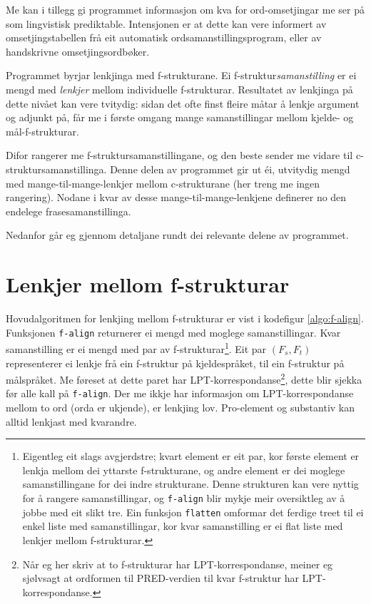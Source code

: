 \documentclass[11pt,a4paper,oneside,draft]{book}
\begin{document}
Me kan i tillegg gi programmet informasjon om kva for ord-omsetjingar
me ser på som lingvistisk prediktable. Intensjonen er at dette kan
vere informert av omsetjingstabellen frå eit automatisk
ordsamanstillingsprogram, eller av handskrivne omsetjingsordbøker.

Programmet byrjar lenkjinga med f-strukturane. Ei
f-struktur\emph{samanstilling} er ei mengd med \emph{lenkjer} mellom
individuelle f-strukturar. Resultatet av lenkjinga på dette nivået kan
vere tvitydig: sidan det ofte finst fleire måtar å lenkje argument og
adjunkt på, får me i første omgang mange samanstillingar mellom
kjelde- og mål-f-strukturar.

Difor rangerer me f-struktursamanstillingane, og den beste sender me
vidare til c-struktursamanstillinga. Denne delen av programmet gir ut
éi, utvitydig mengd med mange-til-mange-lenkjer mellom c-strukturane
(her treng me ingen rangering). Nodane i kvar av desse
mange-til-mange-lenkjene definerer no den endelege
frasesamanstillinga.

Nedanfor går eg gjennom detaljane rundt dei relevante delene av
programmet.

\section{Lenkjer mellom f-strukturar}
\label{sec-4.1}

\label{SEC:impl-f-lenkjing}

Hovudalgoritmen for lenkjing mellom f-strukturar er vist i kodefigur
\ref{algo:f-align}. Funksjonen \texttt{f-align} returnerer ei mengd med
moglege samanstillingar. Kvar samanstilling er ei mengd med par av
f-strukturar\footnote{Eigentleg eit slags avgjerdstre; kvart element er eit par, kor
        første element er lenkja mellom dei yttarste f-strukturane, og
        andre element er dei moglege samanstillingane for dei indre
        strukturane. Denne strukturen kan vere nyttig for å rangere
        samanstillingar, og \texttt{f-align} blir mykje meir oversiktleg av å
        jobbe med eit slikt tre. Ein funksjon \texttt{flatten} omformar det
        ferdige treet til ei enkel liste med samanstillingar, kor kvar
        samanstilling er ei flat liste med lenkjer mellom
        f-strukturar. }. Eit par $(F_s,F_t)$ representerer ei lenkje frå
ein f-struktur på kjeldespråket, til ein f-struktur på målspråket. Me
føreset at dette paret har LPT-korrespondanse\footnote{Når eg her skriv at to f-strukturar har LPT-korrespondanse,
        meiner eg sjølvsagt at ordformen til PRED-verdien til kvar
        f-struktur har LPT-korrespondanse. }, dette blir
sjekka før alle kall på \texttt{f-align}. Der me ikkje har informasjon om
LPT-korrespondanse mellom to ord (orda er ukjende), er lenkjing
lov. Pro-element og substantiv kan alltid lenkjast med kvarandre.
\end{document}
